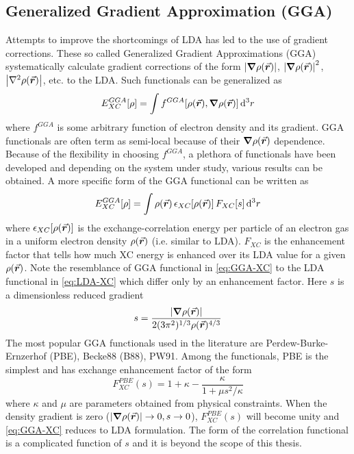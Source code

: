 \subsection{Generalized Gradient Approximation (GGA)}
Attempts to improve the shortcomings of LDA has led to the  use of gradient corrections. These so called Generalized Gradient Approximations (GGA) systematically calculate gradient corrections of the form $\abs{\grad \rho({\va*{r}})}$, $\abs{\grad \rho({\va*{r}})}^2$, $\abs{\laplacian\rho({\va*{r}})}$, etc. to the LDA. Such functionals can be generalized as
\begin{equation}
	E^{GGA}_{XC} [\rho]= \int f^{GGA}[\rho({\va*{r}}),\grad \rho({\va*{r}})] \dd[3]{r}
\end{equation}
where $f^{GGA}$ is some arbitrary function of electron  density and its gradient. GGA functionals are often term as semi-local because of their $\grad \rho({\va*{r}})$ dependence. Because of the flexibility in choosing $f^{GGA}$, a plethora of functionals have been developed and depending on the system under study, various results can be obtained. A more specific form of the GGA functional can be written as \citep{Csonka2009}
\begin{equation} \label{eq:GGA-XC}
	E^{GGA}_{XC} [\rho]= \int \rho({\va*{r}})\, \epsilon_{XC}[\rho({\va*{r}})]\, F_{XC}[s]  \dd[3]{r}
\end{equation}
where $\epsilon_{XC}[\rho({\va*{r}})]$ is the exchange-correlation energy per particle of an electron gas in a uniform electron density $\rho({\va*{r}})$ (i.e. similar to LDA). $F_{XC}$ is the enhancement factor that tells how much XC energy is enhanced over its LDA value for a given  $\rho({\va*{r}})$. Note the resemblance of GGA functional in \eqref{eq:GGA-XC} to the LDA functional in \eqref{eq:LDA-XC} which differ only by an enhancement factor. Here $s$ is a dimensionless reduced gradient
\begin{equation}
	s = \frac{\abs{\grad \rho({\va*{r}})}}{2 (3\pi^2)^{1/3} \rho({\va*{r}})^{4/3}}
\end{equation}
The most popular GGA functionals used in the literature are Perdew-Burke-Ernzerhof (PBE), Becke88 (B88), PW91. Among the functionals, PBE is the  simplest and has  exchange enhancement factor of the form
\begin{equation}
	F_{XC}^{PBE}(s) = 1 + \kappa  - \frac{\kappa}{1+\mu s^2/\kappa}
\end{equation}
where $\kappa$ and $\mu$ are parameters obtained from physical constraints. When the density gradient is zero ($\abs{\grad \rho({\va*{r}})} \rightarrow 0,s \rightarrow 0$), $F_{XC}^{PBE}(s)$ will become unity and \eqref{eq:GGA-XC} reduces to LDA formulation. The form of the  correlation functional is a complicated function of $s$ and it is beyond the scope of this thesis.


